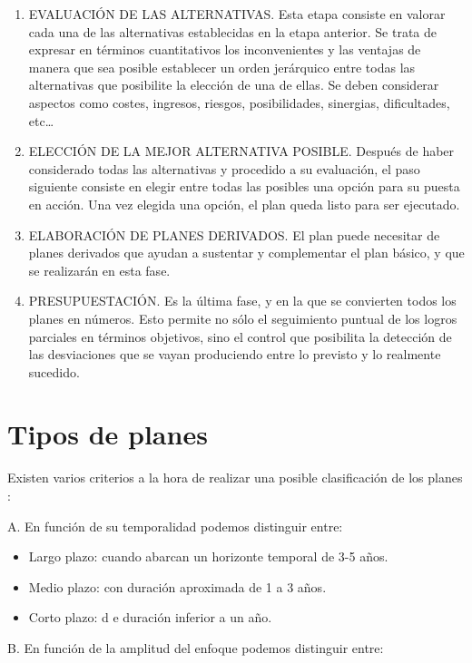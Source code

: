 \documentclass[
]{krantz}
\providecommand{\tightlist}{%
  \setlength{\itemsep}{0pt}\setlength{\parskip}{0pt}}
\begin{document}
\begin{enumerate}
\item
  EVALUACIÓN DE LAS ALTERNATIVAS. Esta etapa consiste en valorar cada una de las alternativas establecidas en la etapa anterior. Se trata de expresar en términos cuantitativos los inconvenientes y las ventajas de manera que sea posible establecer un orden jerárquico entre todas las alternativas que posibilite la elección de una de ellas. Se deben considerar aspectos como costes, ingresos, riesgos, posibilidades, sinergias, dificultades, etc\ldots{}
\item
  ELECCIÓN DE LA MEJOR ALTERNATIVA POSIBLE. Después de haber considerado todas las alternativas y procedido a su evaluación, el paso siguiente consiste en elegir entre todas las posibles una opción para su puesta en acción. Una vez elegida una opción, el plan queda listo para ser ejecutado.
\item
  ELABORACIÓN DE PLANES DERIVADOS. El plan puede necesitar de planes derivados que ayudan a sustentar y complementar el plan básico, y que se realizarán en esta fase.
\item
  PRESUPUESTACIÓN. Es la última fase, y en la que se convierten todos los planes en números. Esto permite no sólo el seguimiento puntual de los logros parciales en términos objetivos, sino el control que posibilita la detección de las desviaciones que se vayan produciendo entre lo previsto y lo realmente sucedido.
\end{enumerate}

\hypertarget{tipos-de-planes}{%
\section{Tipos de planes}\label{tipos-de-planes}}

Existen varios criterios a la hora de realizar una posible clasificación de los planes \citep{cuervo2008}:

A. En función de su temporalidad podemos distinguir entre:

\begin{itemize}
\tightlist
\item
  Largo plazo: cuando abarcan un horizonte temporal de 3-5 años.
\item
  Medio plazo: con duración aproximada de 1 a 3 años.
\item
  Corto plazo: d e duración inferior a un año.
\end{itemize}

B. En función de la amplitud del enfoque podemos distinguir entre:
\end{document}
